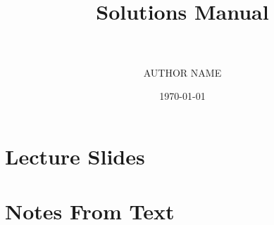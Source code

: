 %
%
%
%



\title{	
\normalfont \normalsize 
\textsc{} \\ [25pt] %
\horrule{0.5pt} \\[0.4cm] %
\huge Solutions Manual \\ %
\horrule{2pt} \\[0.5cm] %
}

\author{AUTHOR NAME} %

\date{\normalsize\today} %



\maketitle %
\tableofcontents

\part{Lecture Slides}










\part{Notes From Text}

\printindex


